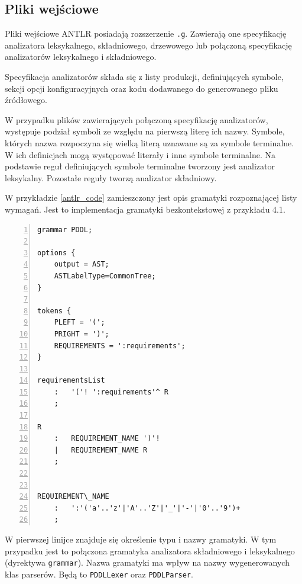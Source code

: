 \subsection{Pliki wejściowe}

Pliki wejściowe ANTLR posiadają rozszerzenie \texttt{.g}. Zawierają one specyfikację
analizatora leksykalnego, składniowego, drzewowego lub połączoną specyfikację
analizatorów leksykalnego i składniowego. 

Specyfikacja analizatorów składa się z listy produkcji, definiujących symbole,
 sekcji opcji konfiguracyjnych oraz kodu dodawanego do generowanego
pliku źródłowego.

W przypadku plików zawierających połączoną specyfikację analizatorów, występuje
podział symboli ze względu na pierwszą literę ich nazwy.
 Symbole, których nazwa rozpoczyna się wielką literą uznawane są
za symbole terminalne. W ich definicjach mogą występować literały i inne
symbole terminalne. Na podstawie reguł definiujących symbole terminalne
tworzony jest analizator leksykalny. Pozostałe reguły tworzą analizator
składniowy.


W przykładzie \ref{antlr_code} zamieszczony jest opis gramatyki rozpoznającej
listy wymagań. Jest to implementacja gramatyki bezkontekstowej z przykładu
4.1.

\setcounter{lstlisting}{1}
\begin{Code}[h!]
\begin{lstlisting}[label=antlr_code, caption=Gramatyka ANTLR opisująca listę wymagań, numbers=left, frame=single]
grammar PDDL;

options {
	output = AST;
	ASTLabelType=CommonTree;
}

tokens {
	PLEFT = '(';
	PRIGHT = ')';
	REQUIREMENTS = ':requirements';
}

requirementsList
	:	'('! ':requirements'^ R
	;

R
	:	REQUIREMENT_NAME ')'!
	|	REQUIREMENT_NAME R
	;


REQUIREMENT\_NAME
	:	':'('a'..'z'|'A'..'Z'|'_'|'-'|'0'..'9')+
	;

\end{lstlisting}
\end{Code}

W pierwszej linijce znajduje się określenie typu i nazwy
gramatyki. W tym przypadku jest to połączona gramatyka analizatora
składniowego i leksykalnego (dyrektywa \texttt{grammar}). Nazwa gramatyki
ma wpływ na nazwy wygenerowanych klas parserów. Będą to 
\texttt{PDDLLexer} oraz \texttt{PDDLParser}.

